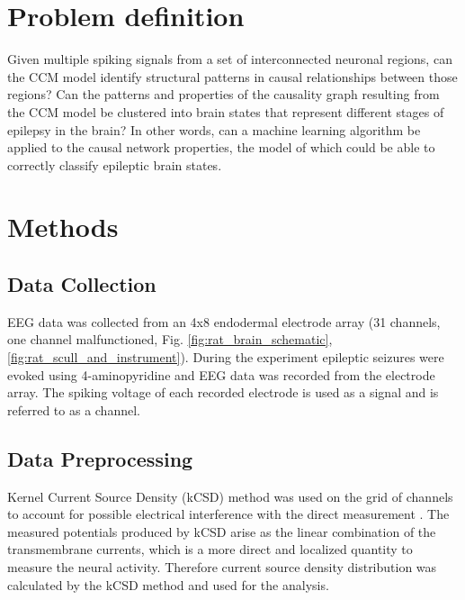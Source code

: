 \documentclass[journal,12pt,onecolumn,draftclsnofoot]{IEEEtran}  %
\begin{document}


% 

\clearpage

\clearpage



% 

\section{Problem definition}

Given multiple spiking signals from a set of interconnected neuronal regions, can the CCM model identify structural patterns in causal relationships between those regions? Can the patterns and properties of the causality graph resulting from the CCM model be clustered into brain states that represent different stages of epilepsy in the brain? In other words, can a machine learning algorithm be applied to the causal network properties, the model of which could be able to correctly classify epileptic brain states.

\section{Methods}
\subsection{Data Collection}
EEG data was collected from an 4x8 endodermal electrode array (31 channels, one channel malfunctioned, Fig. \ref{fig:rat_brain_schematic}, \ref{fig:rat_scull_and_instrument}). During the experiment epileptic seizures were evoked using 4-aminopyridine and EEG data was recorded from the electrode array. The spiking voltage of each recorded electrode is used as a signal and is referred to as a channel. 

\subsection{Data Preprocessing}
Kernel Current Source Density (kCSD) method was used on the grid of channels to account for possible electrical interference with the direct measurement \cite{Potworowski2012}. The measured potentials produced by kCSD arise as the linear combination of the transmembrane currents, which is a more direct and localized quantity to measure the neural activity. Therefore current source density distribution was calculated by the kCSD method and used for the analysis.
\end{document}

